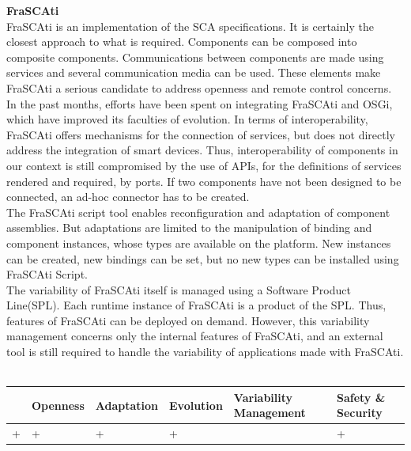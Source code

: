 \vspace{0.5cm}

{\bf FraSCAti}\\

FraSCAti\cite{Melisson:2010} is an implementation of the SCA specifications. It is certainly the closest approach to what is required. Components can be composed into composite components. Communications between components are made using services and several communication media can be used. These elements make FraSCAti a serious candidate to address openness and remote control concerns.\\
In the past months, efforts have been spent on integrating FraSCAti and OSGi, which have improved its faculties of evolution. In terms of interoperability, FraSCAti offers mechanisms for the connection of services, but does not directly address the integration of smart devices. Thus, interoperability of components in our context is still compromised by the use of APIs, for the definitions of services rendered and required, by ports. If two components have not been designed to be connected, an ad-hoc connector has to be created.\\
The FraSCAti script tool enables reconfiguration and adaptation of component assemblies. But adaptations are limited to the manipulation of binding and component instances, whose types are available on the platform. New instances can be created, new bindings can be set, but no new types can be installed using FraSCAti Script.\\
The variability of FraSCAti itself is managed using a Software Product Line(SPL). Each runtime instance of FraSCAti is a product of the SPL. Thus, features of FraSCAti can be deployed on demand. However, this variability management concerns only the internal features of FraSCAti, and an external tool is still required to handle the variability of applications made with FraSCAti.\\
\\
\begin{tabular}{ >{\centering}m{}| >{\centering}m{} >{\centering}m{}| >{\centering}m{} >{\centering}m{}| >{\centering\arraybackslash}m{}}
{\tiny Interoperability} & {\tiny Openness} & {\tiny Adaptation} & {\tiny Evolution} & {\tiny Variability Management} & {\tiny Safety \& Security}\\
 \hline
 + & + & + & + &  & + \\ 
  \hline
\end{tabular}\\


